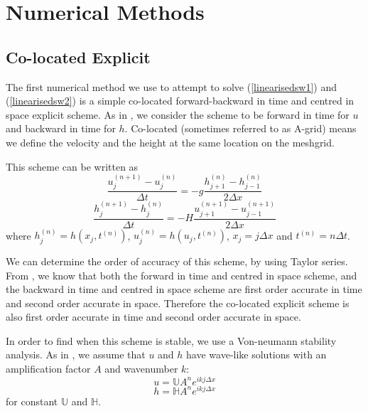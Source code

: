 \documentclass[a4paper,12pt, notitlepage]{article}
\begin{document}
\section{Numerical Methods}\label{numericalmethodssection}

\subsection {Co-located Explicit}
The first numerical method we use to attempt to solve (\ref{linearisedsw1}) and (\ref{linearisedsw2}) is a simple co-located forward-backward in time and centred in space explicit scheme. As in \cite{MPE textbook}, we consider the scheme to be forward in time for $u$ and backward in time for $h$. Co-located (sometimes referred to as A-grid) means we define the velocity and the height at the same location on the meshgrid.

This scheme can be written as 
\begin{equation} \label{FTCSAgrid}
\frac{u_{j}^{(n+1)} - u_{j}^{(n)}}{\Delta t} = -g \frac{h_{j+1}^{(n)} - h_{j-1}^{(n)}}{2\Delta x}
\end{equation}
\begin{equation}\label{BTCSAgrid}
\frac{h_{j}^{(n+1)} - h_{j}^{(n)}}{\Delta t} = -H \frac{u_{j+1}^{(n+1)} - u_{j-1}^{(n+1)}}{2\Delta x}
\end{equation}
where $h_{j}^{(n)} = h(x_{j}, t^{(n)})$, $u_{j}^{(n)} = h(u_{j}, t^{(n)})$, $x_{j} = j\Delta x$ and $t^{(n)} = n\Delta t$. 

We can determine the order of accuracy of this scheme, by using Taylor series. From \cite{MPE textbook}, we know that both the forward in time and centred in space scheme, and the backward in time and centred in space scheme are first order accurate in time and second order accurate in space. Therefore the co-located explicit scheme is also first order accurate in time and second order accurate in space.

In order to find when this scheme is stable, we use a Von-neumann stability analysis. As in \cite{MPE textbook}, we assume that $u$ and $h$ have wave-like solutions with an amplification factor $A$ and wavenumber $k$:
\begin{equation} \label{wavelikeu}
u  =  \mathbb{U}  A^{n} e^{ikj\Delta x}
\end{equation}
\begin{equation} \label{wavelikeh}
h  =  \mathbb{H} A^{n} e^{ikj\Delta x}
\end{equation}
for constant $\mathbb{U}$ and $\mathbb{H}$.
\end{document}

